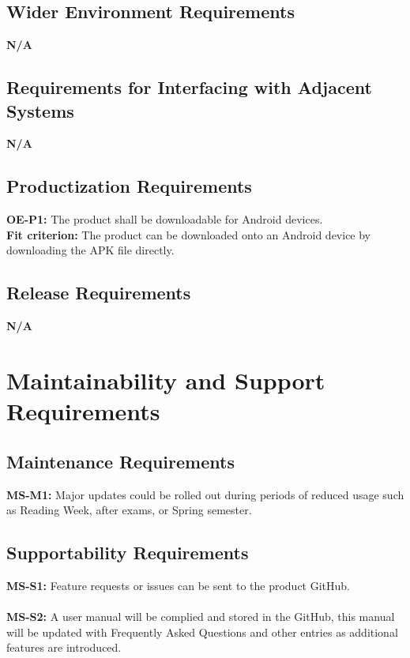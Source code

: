 \documentclass[12pt]{article}
\begin{document}
\subsection{Wider Environment Requirements}
  \textbf{N/A}\\
\subsection{Requirements for Interfacing with Adjacent Systems}
  \textbf{N/A}\\
\subsection{Productization Requirements}
  \textbf{OE-P1:} The product shall be downloadable for Android devices.\\
  \textbf{Fit criterion:} The product can be downloaded onto an Android device by downloading the APK file directly.\\
\subsection{Release Requirements}
  \textbf{N/A}\\

\section{Maintainability and Support Requirements}
\subsection{Maintenance Requirements}
  \textbf{MS-M1:} Major updates could be rolled out during periods of reduced usage such as Reading Week, after exams, or Spring semester.\\
\subsection{Supportability Requirements}
  \textbf{MS-S1:} Feature requests or issues can be sent to the product GitHub.\\\\
  \textbf{MS-S2:} A user manual will be complied and stored in the GitHub, this manual will be updated with Frequently Asked Questions and other entries as additional features are introduced.\\
\end{document}
